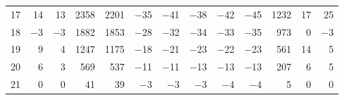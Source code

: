\begin{table}[H]
\begin{tabular}{crrrrrrrrrrrr}
        17 & 14 & 13 & 2358 & 2201 & $-$35 & $-$41 & $-$38 & $-$42 & $-$45 & 1232 & 17 & 25 \\
        18 & $-$3 & $-$3 & 1882 & 1853 & $-$28 & $-$32 & $-$34 & $-$33 & $-$35 & 973 & 0 & $-$3 \\
        19 & 9 & 4 & 1247 & 1175 & $-$18 & $-$21 & $-$23 & $-$22 & $-$23 & 561 & 14 & 5 \\
        20 & 6 & 3 & 569 & 537 & $-$11 & $-$11 & $-$13 & $-$13 & $-$13 & 207 & 6 & 5 \\
        21 & 0 & 0 & 41 & 39 & $-$3 & $-$3 & $-$3 & $-$4 & $-$4 & 5 & 0 & 0 \\
        \hline
    \end{tabular}
\end{table}

